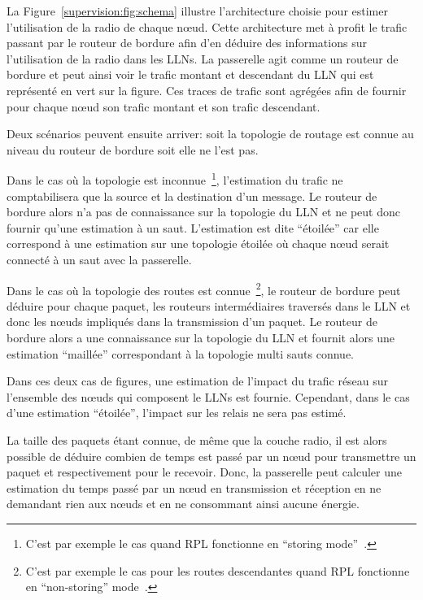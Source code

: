 La Figure~\ref{supervision:fig:schema} illustre l'architecture choisie pour estimer l'utilisation de la radio de chaque nœud.
Cette architecture met à profit le trafic passant par le routeur de bordure afin d'en déduire des informations sur l'utilisation de la radio dans les \ac{LLN}s.
La passerelle agit comme un routeur de bordure et peut ainsi voir le trafic montant et descendant du \ac{LLN} qui est représenté en vert sur la figure.
Ces traces de trafic sont agrégées afin de fournir pour chaque nœud son trafic montant et son trafic descendant.


Deux scénarios peuvent ensuite arriver: soit la topologie de routage est connue au niveau du routeur de bordure soit elle ne l'est pas.

Dans le cas où la topologie est inconnue~\footnote{C'est par exemple le cas quand \ac{RPL} fonctionne en ``storing mode''~\cite{rfc6550}.}, l'estimation du trafic ne comptabilisera que la source et la destination d'un message.
Le routeur de bordure alors n'a pas de connaissance sur la topologie du \ac{LLN} et ne  peut donc fournir qu'une estimation à un saut.
L'estimation est dite ``étoilée'' car elle correspond à une estimation sur une topologie étoilée où chaque nœud serait connecté à un saut avec la passerelle.

Dans le cas où la topologie des routes est connue~\footnote{C'est par exemple le cas pour les routes descendantes quand \ac{RPL} fonctionne en ``non-storing'' mode~\cite{rfc6550}.}, le routeur de bordure peut déduire pour chaque paquet, les routeurs intermédiaires traversés dans le \ac{LLN} et donc les nœuds impliqués dans la transmission d'un paquet.
Le routeur de bordure alors a une connaissance sur la topologie du \ac{LLN} et fournit alors une estimation ``maillée'' correspondant à la topologie multi sauts connue.

Dans ces deux cas de figures, une estimation de l'impact du trafic réseau sur l'ensemble des nœuds qui composent le \ac{LLN}s est fournie.
Cependant, dans le cas d'une estimation ``étoilée'', l'impact sur les relais ne sera pas estimé.


La taille des paquets étant connue, de même que la couche radio, il est alors possible de déduire combien de temps est passé par un nœud pour transmettre un paquet et respectivement pour le recevoir.
Donc, la passerelle peut calculer une estimation du temps passé par un nœud en transmission et réception en ne demandant rien aux nœuds et en ne consommant ainsi aucune énergie.

